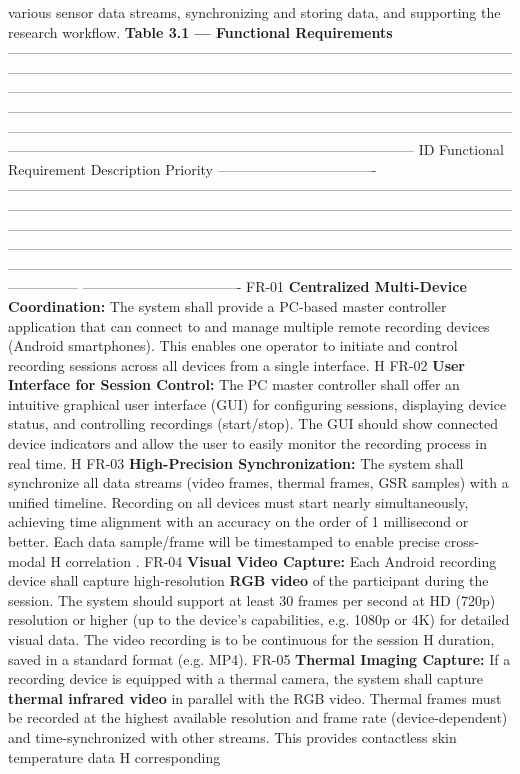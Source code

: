 various sensor data streams, synchronizing and storing data, and supporting the research workflow. \textbf{Table 3.1 --- Functional Requirements} --------------------------------------------------------------------------------------------------------------------------------------------------------------------------------------------------------------------------------------------------------------------------------------------------------------------------------------------------------------------------------------------------------------------------------------------------------------------------------------------------------------------------------------------------------------------------------------------------------------------------------------------------- ID Functional Requirement Description Priority ---------------------------------- --------------------------------------------------------------------------------------------------------------------------------------------------------------------------------------------------------------------------------------------------------------------------------------------------------------------------------------------------------------------------------------------------------------------------------------------------------------------------------------------------------------------------------------------------------------------------- ---------------------------------- FR-01 \textbf{Centralized Multi-Device Coordination:} The system shall provide a PC-based master controller application that can connect to and manage multiple remote recording devices (Android smartphones). This enables one operator to initiate and control recording sessions across all devices from a single interface. H FR-02 \textbf{User Interface for Session Control:} The PC master controller shall offer an intuitive graphical user interface (GUI) for configuring sessions, displaying device status, and controlling recordings (start/stop). The GUI should show connected device indicators and allow the user to easily monitor the recording process in real time. H FR-03 \textbf{High-Precision Synchronization:} The system shall synchronize all data streams (video frames, thermal frames, GSR samples) with a unified timeline. Recording on all devices must start nearly simultaneously, achieving time alignment with an accuracy on the order of 1 millisecond or better. Each data sample/frame will be timestamped to enable precise cross-modal H correlation . FR-04 \textbf{Visual Video Capture:} Each Android recording device shall capture high-resolution \textbf{RGB video} of the participant during the session. The system should support at least 30 frames per second at HD (720p) resolution or higher (up to the device's capabilities, e.g. 1080p or 4K) for detailed visual data. The video recording is to be continuous for the session H duration, saved in a standard format (e.g. MP4). FR-05 \textbf{Thermal Imaging Capture:} If a recording device is equipped with a thermal camera, the system shall capture \textbf{thermal infrared video} in parallel with the RGB video. Thermal frames must be recorded at the highest available resolution and frame rate (device-dependent) and time-synchronized with other streams. This provides contactless skin temperature data H corresponding 